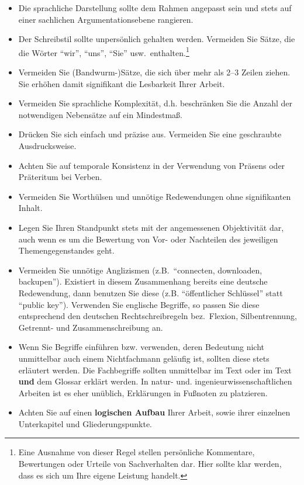 \begin{itemize}
\item Die sprachliche Darstellung sollte dem Rahmen angepasst sein und stets auf einer sachlichen Argumentationsebene rangieren.
\item Der Schreibstil sollte unpersönlich gehalten werden.
Vermeiden Sie Sätze, die die Wörter "`wir"', "`uns"', "`Sie"' usw.~enthalten.\footnote{Eine Ausnahme von dieser Regel stellen persönliche Kommentare, Bewertungen oder Urteile von Sachverhalten dar. Hier sollte klar werden, dass es sich um Ihre eigene Leistung handelt.}
\item Vermeiden Sie (Bandwurm-)Sätze, die sich über mehr als 2--3 Zeilen ziehen. Sie erhöhen damit signifikant die Lesbarkeit Ihrer Arbeit.
\item Vermeiden Sie sprachliche Komplexität, d.h. beschränken Sie die Anzahl der notwendigen Nebensätze auf ein Mindestmaß.
\item Drücken Sie sich einfach und präzise aus. Vermeiden Sie eine \glqq geschraubte\grqq\, Ausdrucksweise.
\item Achten Sie auf temporale Konsistenz in der Verwendung von Präsens oder Präteritum  bei Verben.
\item Vermeiden Sie Worthülsen und unnötige Redewendungen ohne signifikanten Inhalt.
\item Legen Sie Ihren Standpunkt stets mit der angemessenen Objektivität dar, auch wenn es um die Bewertung von Vor- oder Nachteilen des jeweiligen Themengegenstandes geht.
\item Vermeiden Sie unnötige Anglizismen (z.B.~"`connecten, downloaden, backupen"').
Existiert in diesem Zusammenhang bereits eine deutsche Redewendung, dann benutzen Sie diese (z.B. "`öffentlicher Schlüssel"' statt "`public key"').
Verwenden Sie englische Begriffe, so passen Sie diese entsprechend den deutschen Rechtschreibregeln bez.~Flexion, Silbentrennung, Getrennt- und Zusammenschreibung an.
\item Wenn Sie Begriffe einführen bzw. verwenden, deren Bedeutung nicht unmittelbar auch einem Nichtfachmann geläufig ist, sollten diese stets erläutert werden.
Die Fachbegriffe sollten unmittelbar im Text oder im Text {\bf und} dem Glossar erklärt werden.
In natur- und. ingenieurwissenschaftlichen Arbeiten ist es eher unüblich, Erklärungen in Fußnoten zu platzieren.
\item Achten Sie auf einen {\bf logischen Aufbau} Ihrer Arbeit, sowie ihrer einzelnen Unterkapitel und Gliederungspunkte.

\end{itemize}
